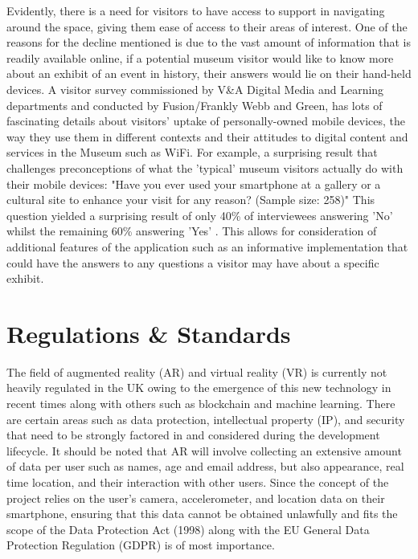Evidently, there is a need for visitors to have access to support in navigating around the space, giving them ease of access to their areas of interest. One of the reasons for the decline mentioned is due to the vast amount of information that is readily available online, if a potential museum visitor would like to know more about an exhibit of an event in history, their answers would lie on their hand-held devices. A visitor survey commissioned by V\&A Digital Media and Learning departments and conducted by Fusion/Frankly Webb and Green, has lots of fascinating details about visitors' uptake of personally-owned mobile devices, the way they use them in different contexts and their attitudes to digital content and services in the Museum such as WiFi. For example, a surprising result that challenges preconceptions of what the 'typical' museum visitors actually do with their mobile devices: "Have you ever used your smartphone at a gallery or a cultural site to enhance your visit for any reason? (Sample size: 258)" This question yielded a surprising result of only 40\% of interviewees answering 'No' whilst the remaining 60\% answering 'Yes' \cite{Lewis}. This allows for consideration of additional features of the application such as an informative implementation that could have the answers to any questions a visitor may have about a specific exhibit.

\section{Regulations \& Standards}
The field of augmented reality (AR) and virtual reality (VR) is currently not heavily regulated in the UK owing to the emergence of this new technology in recent times along with others such as blockchain and machine learning. There are certain areas such as data protection, intellectual property (IP), and security that need to be strongly factored in and considered during the development lifecycle. It should be noted that AR will involve collecting an extensive amount of data per user such as names, age and email address, but also appearance, real time location, and their interaction with other users.  Since the concept of the project relies on the user's camera, accelerometer, and location data on their smartphone, ensuring that this data cannot be obtained unlawfully and fits the scope of the Data Protection Act (1998) along with the EU General Data Protection Regulation (GDPR) is of most importance.\cite{ITProPortal}\\

